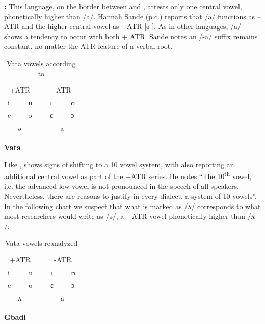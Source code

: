 \documentclass[output=paper
,newtxmath
,modfonts
,nonflat]{langsci/langscibook}
\begin{document}
\textbf{:} This language, on the border between  and , attests only one central vowel, phonetically higher than /a/. Hannah Sande (p.c.) reports that /a/ functions as –ATR and the higher central vowel as +ATR [ə{} ].  As in other  languages, /a/ shows a tendency to occur with both + ATR.  Sande notes an /-a/ suffix remains constant, no matter the ATR feature of a verbal root. 

\begin{table}
\caption{Vata vowels according to \citet{Kaye1980}}	
\label{tab:zogbo:14}
\begin{tabular}{lllllll}
\multicolumn{3}{c}{+ATR} && \multicolumn{3}{c}{-ATR}\\ 
i  &&  u  &~&  ɪ  &&  ʊ\\

e  &&  o  &&  ɛ  &&  ɔ\\

& ə   &&&&     a \\
	\end{tabular}
\end{table}

{\noindent\textbf{Vata} }

Like ,  shows signs of shifting to a 10 vowel system, with \citet[70]{Kaye1980} also reporting an additional central vowel as part of the +ATR series. He notes “The 10\textsuperscript{th} vowel, i.e. the advanced low vowel is not pronounced in the speech of all  speakers.  Nevertheless, there are reasons to justify in every  dialect, a system of 10 vowels”. In the following chart we suspect that what is marked as /ʌ/ corresponds to what most  researchers would write as /ə/, a  +ATR vowel phonetically higher than /ʌ /:


\begin{table}
\caption{Vata vowels reanalyzed}	
\label{tab:zogbo:15}
\begin{tabular}{lllllll}
\multicolumn{3}{c}{+ATR} && \multicolumn{3}{c}{-ATR}\\ 
i  &&  u  &~&  ɪ  &&  ʊ\\

e  &&  o  &&  ɛ  &&  ɔ\\

& ʌ   &&&&     a \\
	\end{tabular}
\end{table}

{\noindent\textbf{Gbadi} }
\end{document}
